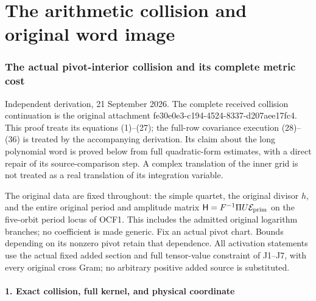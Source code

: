 \documentclass[11pt]{article}
\begin{document}
\clearpage\part{The arithmetic collision and original word image}
\section{The actual pivot-interior collision and its complete metric cost}\label{the-actual-pivot-interior-collision-and-its-complete-metric-cost}

Independent derivation, 21 September 2026. The complete received collision continuation is the original attachment fe30e0e3-c194-4524-8337-d207aee17fc4. This proof treats its equations (1)--(27); the full-row covariance execution (28)--(36) is treated by the accompanying derivation. Its claim about the long polynomial word is proved below from full quadratic-form estimates, with a direct repair of its source-comparison step. A complex translation of the inner grid is not treated as a real translation of its integration variable.

The original data are fixed throughout: the simple quartet, the original divisor \(h\), and the entire original period and amplitude matrix \(\mathsf H=F^{-1}\Pi U\mathcal E_{\rm prim}\) on the five-orbit period locus of OCF1. This includes the admitted original logarithm branches; no coefficient is made generic. Fix an actual pivot chart. Bounds depending on its nonzero pivot retain that dependence. All activation statements use the actual fixed added section and full tensor-value constraint of J1--J7, with every original cross Gram; no arbitrary positive added source is substituted.

\subsection{1. Exact collision, full kernel, and physical coordinate}\label{exact-collision-full-kernel-and-physical-coordinate}
\end{document}
